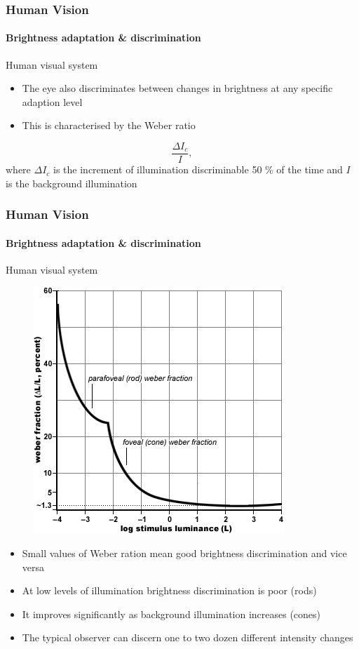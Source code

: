 \documentclass{beamer}
\begin{document}
\begin{frame}
  \frametitle{Human Vision}
  \framesubtitle{Brightness adaptation \& discrimination}
  \begin{block}{Human visual system}
    \begin{itemize}\scriptsize
    \item The eye also discriminates between changes in brightness at any specific adaption level
    \item This is characterised by the Weber ratio
    \end{itemize}
    \begin{equation}
      \frac{\Delta I_c}{I},
    \end{equation}
    {\scriptsize where $\Delta I_c$ is the increment of illumination discriminable 50 \% of the time and $I$ is the background illumination}
  \end{block}
\end{frame}

\begin{frame}
  \frametitle{Human Vision}
  \framesubtitle{Brightness adaptation \& discrimination}
  \begin{block}{Human visual system}
    \begin{figure}
      \centering
      \includegraphics[height=.35\textheight]{./images/wr.png}
    \end{figure}
    \begin{itemize}\scriptsize
    \item Small values of Weber ration mean good brightness discrimination and vice versa
    \item At low levels of illumination brightness discrimination is poor (rods)
    \item It improves significantly as background illumination increases (cones)
    \item The typical observer can discern one to two dozen different intensity changes
    \end{itemize}
  \end{block}
\end{frame}
\end{document}
